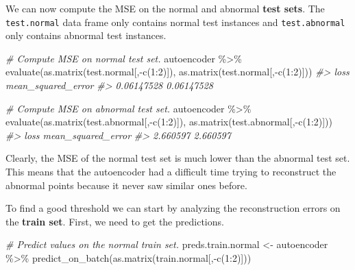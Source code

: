 \documentclass[
  11pt,
]{krantz}
\newenvironment{Shaded}{\begin{snugshade}}{\end{snugshade}}
\newcommand{\CommentTok}[1]{\textcolor[rgb]{0.37,0.37,0.37}{\textit{#1}}}
\newcommand{\DecValTok}[1]{\textcolor[rgb]{0.06,0.06,0.06}{#1}}
\newcommand{\FunctionTok}[1]{\textcolor[rgb]{0,0,0}{#1}}
\newcommand{\NormalTok}[1]{#1}
\newcommand{\OtherTok}[1]{\textcolor[rgb]{0.37,0.37,0.37}{#1}}
\newcommand{\SpecialCharTok}[1]{\textcolor[rgb]{0,0,0}{#1}}
\begin{document}
We can now compute the MSE on the normal and abnormal \textbf{test sets}. The \texttt{test.normal} data frame only contains normal test instances and \texttt{test.abnormal} only contains abnormal test instances.

\begin{Shaded}
\begin{Highlighting}[]
\CommentTok{\# Compute MSE on normal test set.}
\NormalTok{autoencoder }\SpecialCharTok{\%\textgreater{}\%} \FunctionTok{evaluate}\NormalTok{(}\FunctionTok{as.matrix}\NormalTok{(test.normal[,}\SpecialCharTok{{-}}\FunctionTok{c}\NormalTok{(}\DecValTok{1}\SpecialCharTok{:}\DecValTok{2}\NormalTok{)]),}
                         \FunctionTok{as.matrix}\NormalTok{(test.normal[,}\SpecialCharTok{{-}}\FunctionTok{c}\NormalTok{(}\DecValTok{1}\SpecialCharTok{:}\DecValTok{2}\NormalTok{)]))}
\CommentTok{\#\textgreater{}        loss mean\_squared\_error }
\CommentTok{\#\textgreater{}  0.06147528         0.06147528 }

\CommentTok{\# Compute MSE on abnormal test set.}
\NormalTok{autoencoder }\SpecialCharTok{\%\textgreater{}\%} \FunctionTok{evaluate}\NormalTok{(}\FunctionTok{as.matrix}\NormalTok{(test.abnormal[,}\SpecialCharTok{{-}}\FunctionTok{c}\NormalTok{(}\DecValTok{1}\SpecialCharTok{:}\DecValTok{2}\NormalTok{)]),}
                         \FunctionTok{as.matrix}\NormalTok{(test.abnormal[,}\SpecialCharTok{{-}}\FunctionTok{c}\NormalTok{(}\DecValTok{1}\SpecialCharTok{:}\DecValTok{2}\NormalTok{)]))}
\CommentTok{\#\textgreater{}       loss mean\_squared\_error }
\CommentTok{\#\textgreater{}   2.660597           2.660597}
\end{Highlighting}
\end{Shaded}

Clearly, the MSE of the normal test set is much lower than the abnormal test set. This means that the autoencoder had a difficult time trying to reconstruct the abnormal points because it never saw similar ones before.

To find a good threshold we can start by analyzing the reconstruction errors on the \textbf{train set}. First, we need to get the predictions.

\begin{Shaded}
\begin{Highlighting}[]
\CommentTok{\# Predict values on the normal train set.}
\NormalTok{preds.train.normal }\OtherTok{\textless{}{-}}\NormalTok{ autoencoder }\SpecialCharTok{\%\textgreater{}\%}
  \FunctionTok{predict\_on\_batch}\NormalTok{(}\FunctionTok{as.matrix}\NormalTok{(train.normal[,}\SpecialCharTok{{-}}\FunctionTok{c}\NormalTok{(}\DecValTok{1}\SpecialCharTok{:}\DecValTok{2}\NormalTok{)]))}
\end{Highlighting}
\end{Shaded}
\end{document}
